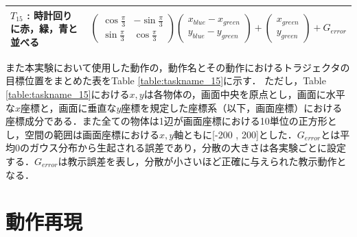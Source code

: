 \begin{table}[h]
\begin{tabular}{|l|l|}
    	$T_{15}$ : 時計回りに赤，緑，青と並べる & 
	$
	\begin{pmatrix}
        	\cos \frac{\pi}{3} & -\sin \frac{\pi}{3} \\
        	\sin \frac{\pi}{3} & \cos \frac{\pi}{3}
	\end{pmatrix}
	\begin{pmatrix}
        	x_{blue}-x_{green} \\
        	y_{blue}-y_{green}
	\end{pmatrix}
      	+
	\begin{pmatrix}
        	x_{green} \\
        	y_{green}
	\end{pmatrix}      	
	+G_{error}
    	$
    	\\ \hline
  	\end{tabular}
\end{table}
また本実験において使用した動作の，動作名とその動作におけるトラジェクタの目標位置をまとめた表をTable \ref{table:taskname_15}に示す．
ただし，Table \ref{table:taskname_15}における$x , y$は各物体の，画面中央を原点とし，画面に水平な$x$座標と，画面に垂直な$y$座標を規定した座標系（以下，画面座標）における座標成分である．また全ての物体は1辺が画面座標における10単位の正方形とし，空間の範囲は画面座標における$x,y$軸ともに[-200 , 200]とした．$G_{error}$とは平均0のガウス分布から生起される誤差であり，分散の大きさは各実験ごとに設定する．$G_{error}$は教示誤差を表し，分散が小さいほど正確に与えられた教示動作となる．


\section{動作再現}

